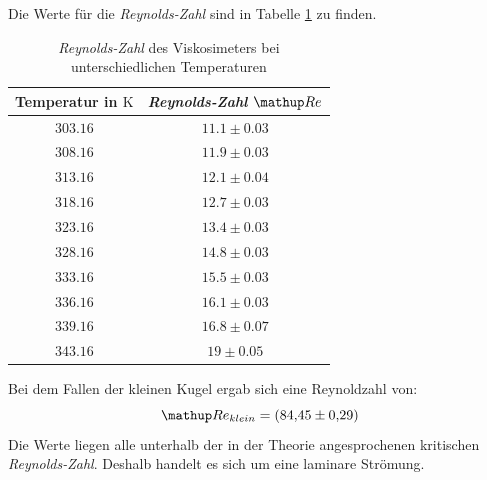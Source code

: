 Die Werte für die \emph{Reynolds-Zahl} sind in Tabelle \ref{tab:rey_visko} %
zu finden.

\begin{table}
\centering
\begin{tabular} {cc}
  \toprule
  Temperatur in $\si{\kelvin}$ & \emph{Reynolds-Zahl} $\map{Re}$ \\
  \midrule
  $\num{303.16}$ & $\num{11.1}\pm \num{0.03}$ \\
  $\num{308.16}$ & $\num{11.9}\pm \num{0.03}$ \\
  $\num{313.16}$ & $\num{12.1}\pm \num{0.04}$ \\
  $\num{318.16}$ & $\num{12.7}\pm \num{0.03}$ \\
  $\num{323.16}$ & $\num{13.4}\pm \num{0.03}$ \\
  $\num{328.16}$ & $\num{14.8}\pm \num{0.03}$ \\
  $\num{333.16}$ & $\num{15.5}\pm \num{0.03}$ \\
  $\num{336.16}$ & $\num{16.1}\pm \num{0.03}$ \\
  $\num{339.16}$ & $\num{16.8}\pm \num{0.07}$ \\
  $\num{343.16}$ & $\num{19}\pm \num{0.05}$ \\
\bottomrule
\end{tabular}
\caption{\emph{Reynolds-Zahl} des Viskosimeters bei unterschiedlichen Temperaturen} %
\label{tab:rey_visko}
\end{table}


Bei dem Fallen der kleinen Kugel ergab sich eine Reynoldzahl von:
\begin{equation*}%
\map{Re}_{klein}=\left(\num{84.45}\pm\num{0.29}\right)
\end{equation*}
Die Werte liegen alle unterhalb der in der Theorie angesprochenen kritischen \emph{Reynolds-Zahl}. %
Deshalb handelt es sich um eine laminare Strömung.


